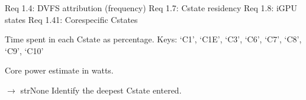 \documentclass[letterpaper,10pt,english]{sphinxmanual}
\begin{document}
\begin{fulllineitems}
\sphinxAtStartPar
Req 1.4: DVFS attribution (frequency)
Req 1.7: C\sphinxhyphen{}state residency
Req 1.8: iGPU states
Req 1.41: Core\sphinxhyphen{}specific C\sphinxhyphen{}states

\begin{fulllineitems}
\label{\detokenize{core.models.energy_measurement:core.models.energy_measurement.PowerState.c_state_residencies}}
\pysigstartsignatures
\pysigline
{}
\pysigstopsignatures
\sphinxAtStartPar
Time spent in each C\sphinxhyphen{}state as percentage.
Keys: ‘C1’, ‘C1E’, ‘C3’, ‘C6’, ‘C7’, ‘C8’, ‘C9’, ‘C10’

\end{fulllineitems}


\begin{fulllineitems}
\label{\detokenize{core.models.energy_measurement:core.models.energy_measurement.PowerState.core_power_watts}}
\pysigstartsignatures
\pysigline
{}
\pysigstopsignatures
\sphinxAtStartPar
Core power estimate in watts.

\end{fulllineitems}


\begin{fulllineitems}
\label{\detokenize{core.models.energy_measurement:core.models.energy_measurement.PowerState.deepest_cstate}}
\pysigstartsignatures
\pysiglinewithargsret
{}
{}
{{ $\rightarrow$ strNone}}
\pysigstopsignatures
\sphinxAtStartPar
Identify the deepest C\sphinxhyphen{}state entered.


\end{fulllineitems}
\end{fulllineitems}
\end{document}
